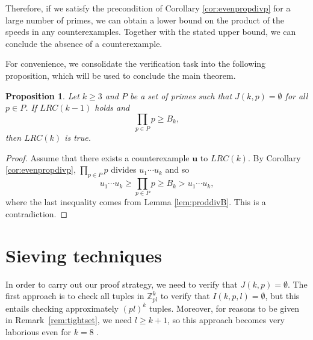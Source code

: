 \documentclass[11pt]{amsart}
\newcommand{\Z}{\mathbb{Z}}
\newcommand{\ubf}{\mathbf{u}}
\newtheorem{proposition}[theorem]{Proposition}
\theoremstyle{definition}
\theoremstyle{remark}
\begin{document}
Therefore, if we satisfy the precondition of Corollary \ref{cor:evenpropdivp} for a large number of primes,
we can obtain a lower bound on the product of the speeds in any counterexamples. 
Together with the stated upper bound, we can conclude the absence of a counterexample.

For convenience, we consolidate the verification task into the following proposition,
which will be used to conclude the main theorem.
\begin{proposition}
\label{prop:verify}
  Let $k \ge 3$ and $P$ be a set of primes such that $J(k,p)=\emptyset$ for all $p\in P$. 
  If $LRC(k-1)$ holds and
  \[\prod_{p \in P} p\geq B_k,\] 
  then $LRC(k)$ is true.
\end{proposition}
\begin{proof}
    Assume that there exists a counterexample $\ubf$ to $LRC(k)$. 
    By Corollary \ref{cor:evenpropdivp}, $\prod_{p\in P}p$ divides $u_1\cdots u_k$ and so 
    \[u_1\cdots u_k\geq \prod_{p \in P} p\geq B_k>u_1\cdots u_k,\] 
    where the last inequality comes from Lemma \ref{lem:proddivB}. 
    This is a contradiction.
\end{proof}

\section{Sieving techniques} \label{sec:sieves}
In order to carry out our proof strategy, we need to verify that $J(k,p)=\emptyset$. 
The first approach is to check all tuples in $\Z^{k}_{pl}$ to verify that $I(k,p,l)=\emptyset$,
but this entails checking approximately $(pl)^k$ tuples. 
Moreover, for reasons to be given in Remark~\ref{rem:tightset},
we need $l\geq k+1$, so this approach becomes very laborious even for $k=8$ \cite{rosenfeld2025lonely2}.
\end{document}
